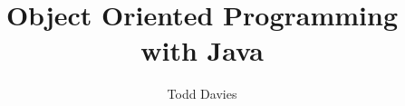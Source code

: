 \newcommand{\coursename}{Object Oriented Programming with Java}
\newcommand{\coursecode}{COMP16212}
\newcommand{\courseinfo}{}
\newcommand{\Author}{Todd Davies} 
\newcommand{\Title}{\coursename}
\author{\Author}
\title{\Title}
